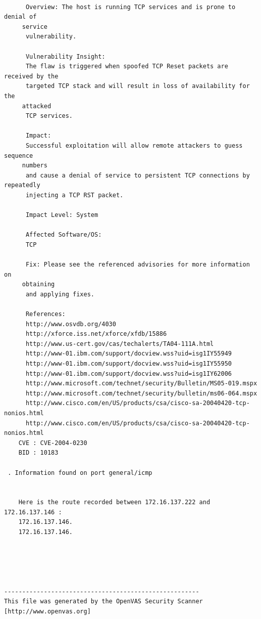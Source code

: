 \documentclass[twoside]{article}
\begin{document}
\begin{lstlisting}
    
      Overview: The host is running TCP services and is prone to denial of
     service
      vulnerability.
    
      Vulnerability Insight:
      The flaw is triggered when spoofed TCP Reset packets are received by the
      targeted TCP stack and will result in loss of availability for the
     attacked
      TCP services.
    
      Impact:
      Successful exploitation will allow remote attackers to guess sequence
     numbers
      and cause a denial of service to persistent TCP connections by repeatedly
      injecting a TCP RST packet.
    
      Impact Level: System
    
      Affected Software/OS:
      TCP
    
      Fix: Please see the referenced advisories for more information on
     obtaining
      and applying fixes.
    
      References:
      http://www.osvdb.org/4030
      http://xforce.iss.net/xforce/xfdb/15886
      http://www.us-cert.gov/cas/techalerts/TA04-111A.html
      http://www-01.ibm.com/support/docview.wss?uid=isg1IY55949
      http://www-01.ibm.com/support/docview.wss?uid=isg1IY55950
      http://www-01.ibm.com/support/docview.wss?uid=isg1IY62006
      http://www.microsoft.com/technet/security/Bulletin/MS05-019.mspx
      http://www.microsoft.com/technet/security/bulletin/ms06-064.mspx
      http://www.cisco.com/en/US/products/csa/cisco-sa-20040420-tcp-nonios.html
      http://www.cisco.com/en/US/products/csa/cisco-sa-20040420-tcp-nonios.html 
    CVE : CVE-2004-0230
    BID : 10183

 . Information found on port general/icmp


    Here is the route recorded between 172.16.137.222 and 172.16.137.146 :
    172.16.137.146.
    172.16.137.146.
    




------------------------------------------------------
This file was generated by the OpenVAS Security Scanner [http://www.openvas.org]
\end{lstlisting}
\newpage
\end{document}
